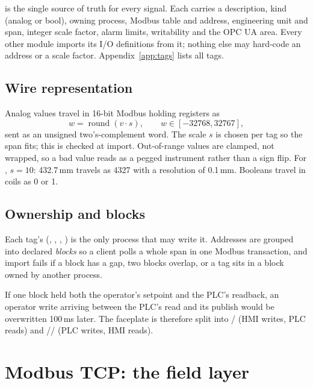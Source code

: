  is the single source of truth for every signal. Each
 carries a description, kind (analog or bool), owning process,
Modbus table and address, engineering unit and span, integer scale factor,
alarm limits, writability and the OPC UA area. Every other module imports its
I/O definitions from it; nothing else may hard-code an address or a scale
factor. Appendix~\ref{app:tags} lists all tags.

\subsection{Wire representation}
Analog values travel in 16-bit Modbus holding registers as
\begin{equation}
  w = \operatorname{round}(v\cdot s), \qquad
  w \in [-32768, 32767],
\end{equation}
sent as an unsigned two's-complement word. The scale $s$ is chosen per tag so
the span fits; this is checked at import. Out-of-range values are clamped,
not wrapped, so a bad value reads as a pegged instrument rather than a sign
flip. For , $s = 10$: 432.7\,mm travels as 4327 with a resolution
of 0.1\,mm. Booleans travel in coils as 0 or 1.

\subsection{Ownership and blocks}
Each tag's  (, , , )
is the only process that may write it. Addresses are grouped into declared
\emph{blocks} so a client polls a whole span in one Modbus transaction, and
import fails if a block has a gap, two blocks overlap, or a tag sits in a
block owned by another process.

\begin{theory}
If one block held both the operator's setpoint and the PLC's readback, an
operator write arriving between the PLC's read and its publish would be
overwritten 100\,ms later. The faceplate is therefore split into
/ (HMI writes, PLC reads) and
// (PLC writes, HMI reads).
\end{theory}

\section{Modbus TCP: the field layer}

